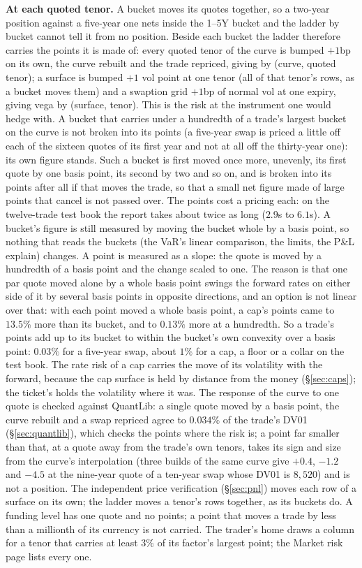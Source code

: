 \documentclass[11pt,a4paper]{article}
\newcommand{\code}[1]{\ifmmode\text{\small\texttt{\detokenize{#1}}}\else{\small\path{#1}}\fi}
\begin{document}
\textbf{At each quoted tenor.} A bucket moves its quotes together, so a two-year position against a five-year one nets inside the 1--5Y bucket and the ladder by bucket cannot tell it from no position. Beside each bucket the ladder therefore carries the points it is made of: every quoted tenor of the curve is bumped $+1$bp on its own, the curve rebuilt and the trade repriced, giving \code{KR01} by (curve, quoted tenor); a surface is bumped $+1$ vol point at one tenor (all of that tenor's rows, as a bucket moves them) and a swaption grid $+1$bp of normal vol at one expiry, giving vega by (surface, tenor). This is the risk at the instrument one would hedge with. A bucket that carries under a hundredth of a trade's largest bucket on the curve is not broken into its points (a five-year swap is priced a little off each of the sixteen quotes of its first year and not at all off the thirty-year one): its own figure stands. Such a bucket is first moved once more, unevenly, its first quote by one basis point, its second by two and so on, and is broken into its points after all if that moves the trade, so that a small net figure made of large points that cancel is not passed over. The points cost a pricing each: on the twelve-trade test book the report takes about twice as long ($2.9$s to $6.1$s). A bucket's figure is still measured by moving the bucket whole by a basis point, so nothing that reads the buckets (the VaR's linear comparison, the limits, the P\&L explain) changes. A point is measured as a slope: the quote is moved by a hundredth of a basis point and the change scaled to one. The reason is that one par quote moved alone by a whole basis point swings the forward rates on either side of it by several basis points in opposite directions, and an option is not linear over that: with each point moved a whole basis point, a cap's points came to $13.5\%$ more than its bucket, and to $0.13\%$ more at a hundredth. So a trade's points add up to its bucket to within the bucket's own convexity over a basis point: $0.03\%$ for a five-year swap, about $1\%$ for a cap, a floor or a collar on the test book. The rate risk of a cap carries the move of its volatility with the forward, because the cap surface is held by distance from the money (\S\ref{sec:caps}); the ticket's \code{IR01} holds the volatility where it was. The response of the curve to one quote is checked against QuantLib: a single quote moved by a basis point, the curve rebuilt and a swap repriced agree to $0.034\%$ of the trade's DV01 (\S\ref{sec:quantlib}), which checks the points where the risk is; a point far smaller than that, at a quote away from the trade's own tenors, takes its sign and size from the curve's interpolation (three builds of the same curve give $+0.4$, $-1.2$ and $-4.5$ at the nine-year quote of a ten-year swap whose DV01 is $8{,}520$) and is not a position. The independent price verification (\S\ref{sec:pnl}) moves each row of a surface on its own; the ladder moves a tenor's rows together, as its buckets do. A funding level has one quote and no points; a point that moves a trade by less than a millionth of its currency is not carried. The trader's home draws a column for a tenor that carries at least $3\%$ of its factor's largest point; the Market risk page lists every one.
\end{document}
